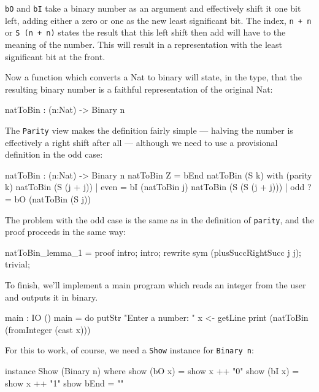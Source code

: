 \noindent
\texttt{bO} and \texttt{bI} take a binary number as an argument and effectively shift it one bit left, adding either a zero or one as the new least significant bit.
The index, \texttt{n + n} or \texttt{S (n + n)} states the result that this left shift then add will have to the meaning of the number.
This will result in a representation with the least significant bit at the front.

Now a function which converts a Nat to binary will state, in the type, that the resulting binary number is a faithful representation of the original Nat:

\begin{code}
natToBin : (n:Nat) -> Binary n
\end{code}

\noindent
The \texttt{Parity} view makes the definition fairly simple --- halving the number is effectively a right shift after all --- although we need to use a provisional definition in the odd case:

\begin{code}
natToBin : (n:Nat) -> Binary n
natToBin Z = bEnd
natToBin (S k) with (parity k)
   natToBin (S (j + j))     | even  = bI (natToBin j)
   natToBin (S (S (j + j))) | odd  ?= bO (natToBin (S j))
\end{code}

\noindent
The problem with the odd case is the same as in the definition of \texttt{parity}, and the proof proceeds in the same way:

\begin{code}
natToBin_lemma_1 = proof {
    intro;
    intro;
    rewrite sym (plusSuccRightSucc j j);
    trivial;
}
\end{code}

\noindent
To finish, we'll implement a main program which reads an integer from the user and outputs it in binary. 

\begin{code}
main : IO ()
main = do putStr "Enter a number: "
          x <- getLine
          print (natToBin (fromInteger (cast x)))
\end{code}

\noindent
For this to work, of course, we need a \texttt{Show} instance for \texttt{Binary n}:

\begin{code}
instance Show (Binary n) where
    show (bO x) = show x ++ "0"
    show (bI x) = show x ++ "1"
    show bEnd = ""
\end{code}


